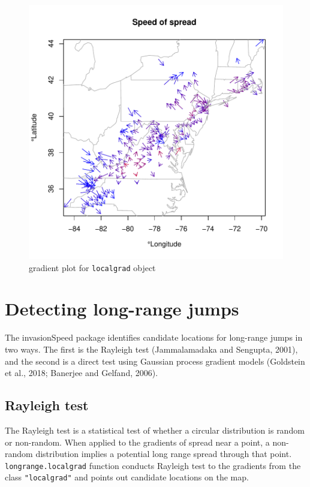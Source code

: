 \documentclass{article}
\newcommand{\strong}[1]{{\normalfont\fontseries{b}\selectfont #1}}
\let\pkg=\strong
\newcommand{\code}[1]{{\tt #1}}
\begin{document}
\begin{figure}
\begin{center}
\includegraphics{invasionSpeed_doc-009}
\end{center}
\caption{gradient plot for \code{localgrad} object}
\label{grad}
\end{figure}

\section{Detecting long-range jumps}

The \pkg{invasionSpeed} package identifies candidate locations for long-range jumps in two ways. The first is the Rayleigh test (Jammalamadaka and Sengupta, 2001), and the second is a direct test using Gaussian process gradient models (Goldstein et al., 2018; Banerjee and Gelfand, 2006).

\subsection{Rayleigh test}

The Rayleigh test is a statistical test of whether a circular distribution is random or non-random. When applied to the gradients of spread near a point, a non-random distribution implies a potential long range spread through that point. \code{longrange.localgrad} function conducts Rayleigh test to the gradients from the class \code{"localgrad"} and points out candidate locations on the map.
\end{document}
